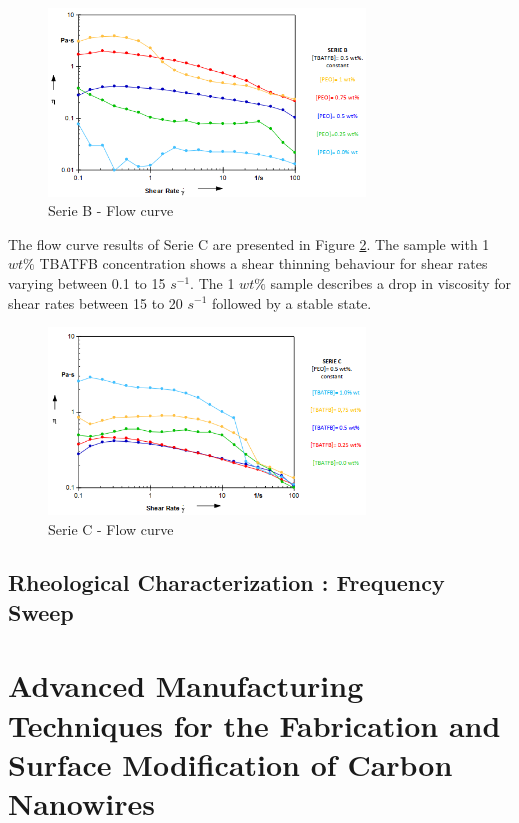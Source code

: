 \begin{figure}[th]
\centering
\includegraphics[width=0.75\textwidth]{./Figures/SerieBflowCurve.png}
\decoRule
\caption[Serie B - Flow curve]{Serie B - Flow curve}
\label{fig:SerieBflowCurve}
\end{figure}

The flow curve results of Serie C are presented in Figure \ref{fig:SerieCflowCurve}. The sample with 1 $w t \%$ TBATFB concentration shows a shear thinning behaviour for shear rates varying between 0.1 to 15 $s^{-1}$. The 1 $w t \%$ sample describes a drop in viscosity for shear rates between 15 to 20 $s^{-1}$ followed by a stable state.  

\begin{figure}[th]
\centering
\includegraphics[width=0.75\textwidth]{./Figures/SerieCflowCurve.png}
\decoRule
\caption[Serie C - Flow curve]{Serie C - Flow curve}
\label{fig:SerieCflowCurve}
\end{figure}

\subsection{Rheological Characterization : \textbf{Frequency Sweep}}



\clearpage

\section{Advanced Manufacturing Techniques for the Fabrication and Surface Modification of Carbon Nanowires \cite{Cardenas2017}}




